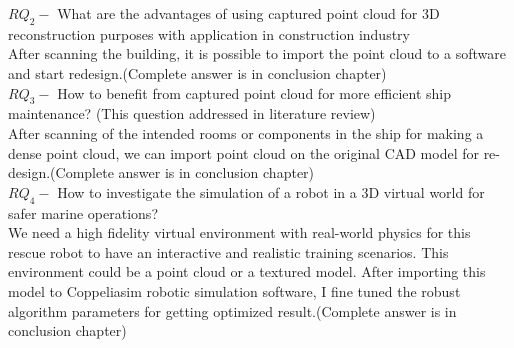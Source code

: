 \noindent $RQ_2-$ What are the advantages of using captured point cloud for 3D reconstruction purposes with application in construction industry\\

\noindent After scanning the building, it is possible to import the point cloud to a software and start redesign.(Complete answer is in conclusion chapter)\\

\noindent $RQ_3-$  How to benefit from captured point cloud for more efficient ship maintenance? (This question addressed in literature review)\\
\noindent After scanning of the intended rooms or components in the ship for making a dense point cloud, we can import point cloud on the original CAD model for re-design.(Complete answer is in conclusion chapter) \\ 


\noindent $RQ_4-$ How to investigate the simulation of a robot in a 3D virtual world for safer marine operations?\\
We need a high fidelity virtual environment with real-world physics for this rescue robot to have an interactive and realistic training scenarios. This environment could be a point cloud or a textured model. After importing this model to Coppeliasim robotic simulation software, I fine tuned the robust algorithm parameters for getting optimized result.(Complete answer is in conclusion chapter)    





